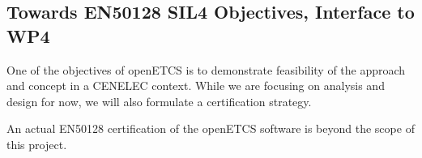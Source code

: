 \subsection{Towards EN50128 SIL4 Objectives, Interface to WP4}

One of the objectives of openETCS is to demonstrate feasibility of the approach and concept in a CENELEC context.
While we are focusing on analysis and design for now, we will also formulate a certification strategy.

An actual EN50128 certification of the openETCS software is beyond the scope of this project.


%
%



